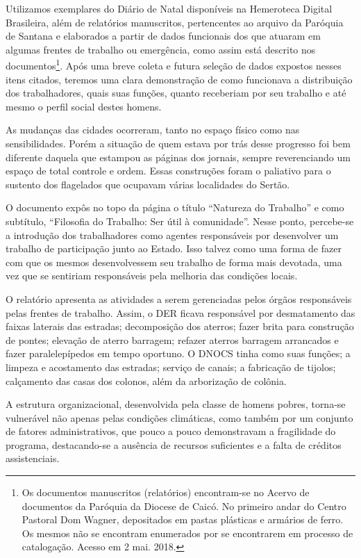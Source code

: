 \begin{refsection}
    Utilizamos exemplares do Diário de Natal disponíveis na Hemeroteca Digital Brasileira, além de relatórios manuscritos, pertencentes ao arquivo da Paróquia de Santana e elaborados a partir de dados funcionais dos que atuaram em algumas frentes de trabalho ou emergência, como assim está descrito nos documentos\footnote{Os documentos manuscritos (relatórios) encontram-se no Acervo de documentos da Paróquia da Diocese de Caicó. No primeiro andar do Centro Pastoral Dom Wagner, depositados em pastas plásticas e armários de ferro. Os mesmos não se encontram enumerados por se encontrarem em processo de catalogação. Acesso em 2 mai. 2018. }. Após uma breve coleta e futura seleção de dados expostos nesses itens citados, teremos uma clara demonstração de como funcionava a distribuição dos trabalhadores, quais suas funções, quanto receberiam por seu trabalho e até mesmo o perfil social destes homens. 

    As mudanças das cidades ocorreram, tanto no espaço físico como nas sensibilidades. Porém a situação de quem estava por trás desse progresso foi bem diferente daquela que estampou as páginas dos jornais, sempre reverenciando um espaço de total controle e ordem. Essas construções foram o paliativo para o sustento dos flagelados que ocupavam várias localidades do Sertão. 

    O documento expôs no topo da página o título ``Natureza do Trabalho'' e como subtítulo, ``Filosofia do Trabalho: Ser útil à comunidade''. Nesse ponto, percebe-se a introdução dos trabalhadores como agentes responsáveis por desenvolver um trabalho de participação junto ao Estado. Isso talvez como uma forma de fazer com que os mesmos desenvolvessem seu trabalho de forma mais devotada, uma vez que se sentiriam responsáveis pela melhoria das condições locais. 

    O relatório apresenta as atividades a serem gerenciadas pelos órgãos responsáveis pelas frentes de trabalho. Assim, o DER ficava responsável por desmatamento das faixas laterais das estradas; decomposição dos aterros; fazer brita para construção de pontes; elevação de aterro barragem; refazer aterros barragem arrancados e fazer paralelepípedos em tempo oportuno. O DNOCS tinha como suas funções; a limpeza e acostamento das estradas; serviço de canais; a fabricação de tijolos; calçamento das casas dos colonos, além da arborização de colônia. 

    A estrutura organizacional, desenvolvida pela classe de homens pobres, tor\-na-se vulnerável não apenas pelas condições climáticas, como também por um conjunto de fatores administrativos, que pouco a pouco demonstravam a fragilidade do programa, destacando-se a ausência de recursos suficientes e a falta de créditos assistenciais.


\end{refsection}
